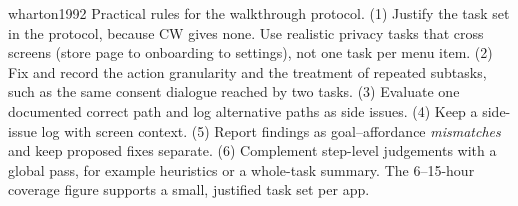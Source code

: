 \begin{papercard}{wharton1992}
 Practical rules for the walkthrough protocol. (1) Justify the task set in the protocol, because CW gives none. Use realistic privacy tasks that cross screens (store page to onboarding to settings), not one task per menu item. (2) Fix and record the action granularity and the treatment of repeated subtasks, such as the same consent dialogue reached by two tasks. (3) Evaluate one documented correct path and log alternative paths as side issues. (4) Keep a side-issue log with screen context. (5) Report findings as goal--affordance \emph{mismatches} and keep proposed fixes separate. (6) Complement step-level judgements with a global pass, for example heuristics or a whole-task summary. The 6--15-hour coverage figure supports a small, justified task set per app.
\end{papercard}
